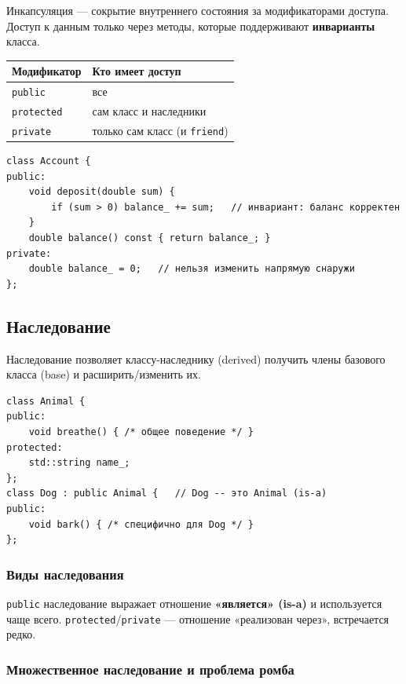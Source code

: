 Инкапсуляция --- сокрытие внутреннего состояния за модификаторами доступа. Доступ
к данным только через методы, которые поддерживают \textbf{инварианты} класса.

\begin{center}
\begin{tabular}{lp{8.5cm}}
\toprule
\textbf{Модификатор} & \textbf{Кто имеет доступ} \\
\midrule
\texttt{public}    & все \\
\texttt{protected} & сам класс и наследники \\
\texttt{private}   & только сам класс (и \texttt{friend}) \\
\bottomrule
\end{tabular}
\end{center}

\begin{lstlisting}
class Account {
public:
    void deposit(double sum) {
        if (sum > 0) balance_ += sum;   // инвариант: баланс корректен
    }
    double balance() const { return balance_; }
private:
    double balance_ = 0;   // нельзя изменить напрямую снаружи
};
\end{lstlisting}

\subsection{Наследование}

Наследование позволяет классу-наследнику (derived) получить члены базового
класса (base) и расширить/изменить их.

\begin{lstlisting}
class Animal {
public:
    void breathe() { /* общее поведение */ }
protected:
    std::string name_;
};
class Dog : public Animal {   // Dog -- это Animal (is-a)
public:
    void bark() { /* специфично для Dog */ }
};
\end{lstlisting}

\subsubsection{Виды наследования}

\texttt{public} наследование выражает отношение \textbf{«является» (is-a)} и
используется чаще всего. \texttt{protected}/\texttt{private} --- отношение
«реализован через», встречается редко.

\subsubsection{Множественное наследование и проблема ромба}

